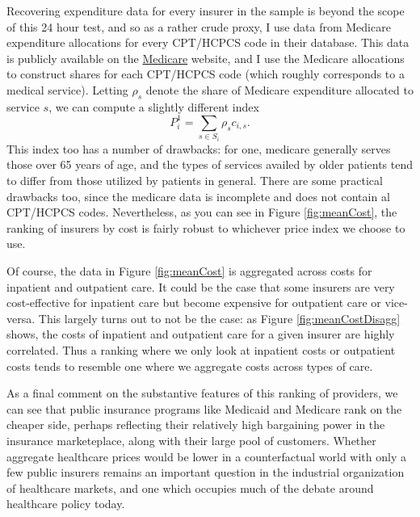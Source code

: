 \documentclass{article}
\begin{document}
Recovering expenditure data for every insurer in the sample is beyond the scope of this 24 hour test, and so as a rather crude proxy, I use data from Medicare expenditure allocations for every CPT/HCPCS code in their database. This data is publicly available on the \href{https://www.cms.gov/data-research/statistics-trends-and-reports/medicare-fee-for-service-parts-a-b/medicare-utilization-part-b}{Medicare} website, and I use the Medicare allocations to construct shares for each CPT/HCPCS code (which roughly corresponds to a medical service). Letting $\rho_s$ denote the share of Medicare expenditure allocated to service $s$, we can compute a slightly different index
\[
	  P^1_i = \sum_{s \in S_i}\rho_s c_{i,s}.
\]
This index too has a number of drawbacks: for one, medicare generally serves those over 65 years of age, and the types of services availed by older patients tend to differ from those utilized by patients in general. There are some practical drawbacks too, since the medicare data is incomplete and does not contain al CPT/HCPCS codes. Nevertheless, as you can see in Figure \ref{fig:meanCost}, the ranking of insurers by cost is fairly robust to whichever price index we choose to use.

Of course, the data in Figure \ref{fig:meanCost} is aggregated across costs for inpatient and outpatient care. It could be the case that some insurers are very cost-effective for inpatient care but become expensive for outpatient care or vice-versa. This largely turns out to not be the case: as Figure \ref{fig:meanCostDisagg} shows, the costs of inpatient and outpatient care for a given insurer are highly correlated. Thus a ranking where we only look at inpatient costs or outpatient costs tends to resemble one where we aggregate costs across types of care. 

As a final comment on the substantive features of this ranking of providers, we can see that public insurance programs like Medicaid and Medicare rank on the cheaper side, perhaps reflecting their relatively high bargaining power in the insurance marketeplace, along with their large pool of customers. Whether aggregate healthcare prices would be lower in a counterfactual world with only a few public insurers remains an important question in the industrial organization of healthcare markets, and one which occupies much of the debate around healthcare policy today.
\end{document}
